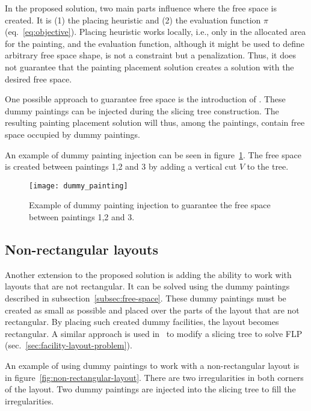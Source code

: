 In the proposed solution, two main parts influence where the free space is created.
It is (1) the placing heuristic and (2) the evaluation function $\pi$ (eq.~\ref{eq:objective}).
Placing heuristic works locally, i.e., only in the allocated area for the painting, and the evaluation
function, although it might be used to define arbitrary free space shape, is not a constraint but a penalization.
Thus, it does not guarantee that the painting placement solution creates a solution with the desired free space.

One possible approach to guarantee free space is the introduction of .
These dummy paintings can be injected during the slicing tree construction.
The resulting painting placement solution will thus, among the paintings, contain free space occupied by dummy paintings.

An example of dummy painting injection can be seen in figure~\ref{fig:dummy-painting}.
The free space is created between paintings 1,2 and 3 by adding a vertical cut $V$ to the tree.


\begin{figure}[h!]
    \texttt{[image: dummy\_painting]}
    \caption[Example of dummy painting injection]{Example of dummy painting injection to guarantee the free space between paintings 1,2 and 3.}
    \label{fig:dummy-painting}
\end{figure}

\subsection{Non-rectangular layouts}\label{subsec:non-rectangular-layouts}

Another extension to the proposed solution is adding the ability to work with layouts that are not rectangular.
It can be solved using the dummy paintings described in subsection~\ref{subsec:free-space}.
These dummy paintings must be created as small as possible and placed over the parts of the layout that are not rectangular.
By placing such created dummy facilities, the layout becomes rectangular.
A similar approach is used in~\cite{scholzExtensionsSTaTSPractical2010} to modify a slicing tree to solve FLP (sec.~\ref{sec:facility-layout-problem}).

An example of using dummy paintings to work with a non-rectangular layout is in figure~\ref{fig:non-rectangular-layout}.
There are two irregularities in both corners of the layout.
Two dummy paintings are injected into the slicing tree to fill the irregularities.

